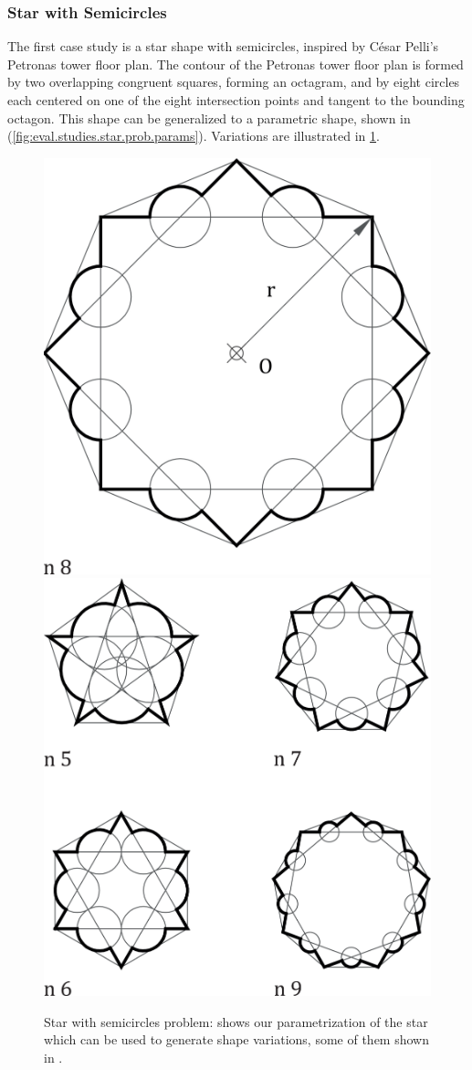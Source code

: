 \subsubsection{Star with Semicircles}%
\label{sec:eval.studies.star}

The first case study is a star shape with semicircles, inspired by César Pelli's
Petronas tower floor plan.  The contour of the Petronas tower floor plan is
formed by two overlapping congruent squares, forming an octagram, and by eight
circles each centered on one of the eight intersection points and tangent to the
bounding octagon.  This shape can be generalized to a parametric shape, shown in
(\cref{fig:eval.studies.star.prob.params}).  Variations are illustrated in
\cref{fig:eval.studies.star.prob}.

\begin{figure}[htb]
  \centering
    {\includegraphics[width=.45\linewidth]{fig/star-problem-params}}
  \hfill
    {\includegraphics[width=.45\linewidth]{fig/star-problem-vars}}
  \caption{\label{fig:eval.studies.star.prob}
    Star with semicircles problem: 
    shows our parametrization of the star which can be used to generate shape
    variations, some of them shown in
    .}%
\end{figure}

